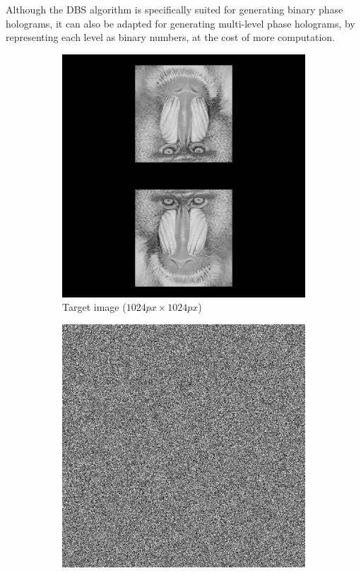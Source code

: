 Although the DBS algorithm is specifically suited for generating binary phase holograms, it can also be adapted for generating multi-level phase holograms, by representing each level as binary numbers, at the cost of more computation.

\begin{figure}[H]
  \centering
  \begin{subfigure}[t]{0.3\textwidth}
    \centering
    \includegraphics[width=\textwidth]{mandrill_2.png}
    \caption{Target image ($1024 px\times 1024 px$)}
    \label{fig:mandrill_2_DBS}
  \end{subfigure}
  \hfill
  \begin{subfigure}[t]{0.3\textwidth}
    \centering
    \includegraphics[width=\textwidth]{DBS_mandrill_2_Holo.png}

\end{subfigure}
\end{figure}
